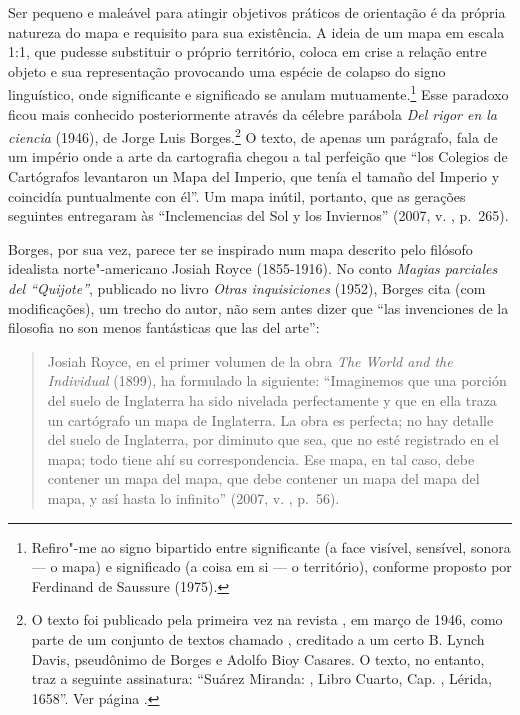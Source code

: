 Ser pequeno e maleável para atingir objetivos práticos de orientação é
da própria natureza do mapa e requisito para sua existência. A ideia de
um mapa em escala 1:1, que pudesse substituir o próprio território,
coloca em crise a relação entre objeto e sua representação provocando
uma espécie de colapso do signo linguístico, onde significante e
significado se anulam mutuamente.\footnote{Refiro"-me ao signo bipartido
  entre significante (a face visível, sensível, sonora --- o mapa) e
  significado (a coisa em si --- o território), conforme proposto por
  Ferdinand de Saussure (1975).} Esse paradoxo ficou mais conhecido
posteriormente através da célebre parábola \emph{Del rigor en la
ciencia} (1946), de Jorge Luis Borges.\footnote{O texto foi publicado
  pela primeira vez na revista {}, em
  março de 1946, como parte de um conjunto de textos chamado
  {}, creditado a um certo B. Lynch Davis, pseudônimo de
  Borges e Adolfo Bioy Casares. O texto, no entanto, traz a seguinte
  assinatura: ``Suárez Miranda: {},
  Libro Cuarto, Cap. , Lérida, 1658''. Ver página .} O texto, de apenas um parágrafo, fala de um império onde a arte da cartografia
chegou a tal perfeição que ``los Colegios de Cartógrafos levantaron un
Mapa del Imperio, que tenía el tamaño del Imperio y coincidía
puntualmente con él''. Um mapa inútil, portanto, que as gerações
seguintes entregaram às ``Inclemencias del Sol y los Inviernos'' (2007,
v. , p.~265).

Borges, por sua vez, parece ter se inspirado num mapa descrito pelo
filósofo idealista norte"-americano Josiah Royce (1855-1916). No conto
\emph{Magias parciales del ``Quijote''}, publicado no livro \emph{Otras
inquisiciones} (1952), Borges cita (com modificações), um trecho do
autor, não sem antes dizer que ``las invenciones de la filosofia no son
menos fantásticas que las del arte'':

\begin{quote}
Josiah Royce, en el primer volumen de la obra \emph{The World and the
Individual} (1899), ha formulado la siguiente: ``Imaginemos que una
porción del suelo de Inglaterra ha sido nivelada perfectamente y que en
ella traza un cartógrafo un mapa de Inglaterra. La obra es perfecta; no
hay detalle del suelo de Inglaterra, por diminuto que sea, que no esté
registrado en el mapa; todo tiene ahí su correspondencia. Ese mapa, en
tal caso, debe contener un mapa del mapa, que debe contener un mapa del
mapa del mapa, y así hasta lo infinito'' (2007, v. , p.~56).
\end{quote}

